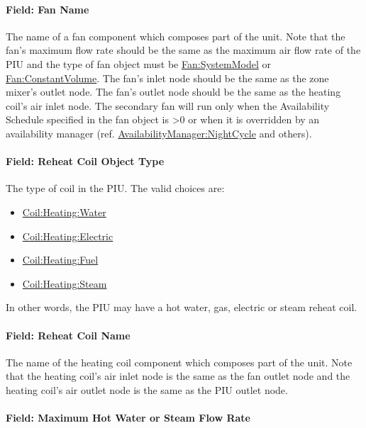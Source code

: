 \paragraph{Field: Fan Name}\label{field-fan-name-1}

The name of a fan component which composes part of the unit. Note that the fan's maximum flow rate should be the same as the maximum air flow rate of the PIU and the type of fan object must be \hyperref[fansystemmodel]{Fan:SystemModel} or \hyperref[fanconstantvolume]{Fan:ConstantVolume}. The fan's inlet node should be the same as the zone mixer's outlet node. The fan's outlet node should be the same as the heating coil's air inlet node. The secondary fan will run only when the Availability Schedule specified in the fan object is >0 or when it is overridden by an availability manager (ref. \hyperref[availabilitymanagernightcycle]{AvailabilityManager:NightCycle} and others).

\paragraph{Field: Reheat Coil Object Type}\label{field-reheat-coil-object-type-3}

The type of coil in the PIU. The valid choices are:

\begin{itemize}
\item
  \hyperref[coilheatingwater]{Coil:Heating:Water}
\item
  \hyperref[coilheatingelectric]{Coil:Heating:Electric}
\item
  \hyperref[coilheatinggas-000]{Coil:Heating:Fuel}
\item
  \hyperref[coilheatingsteam]{Coil:Heating:Steam}
\end{itemize}

In other words, the PIU may have a hot water, gas, electric or steam reheat coil.

\paragraph{Field: Reheat Coil Name}\label{field-reheat-coil-name-3}

The name of the heating coil component which composes part of the unit. Note that the heating coil's air inlet node is the same as the fan outlet node and the heating coil's air outlet node is the same as the PIU outlet node.

\paragraph{Field: Maximum Hot Water or Steam Flow Rate}\label{field-maximum-hot-water-or-steam-flow-rate-4}

